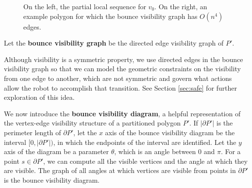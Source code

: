 \documentclass[]{styles/svproc}  %
\begin{document}
\begin{figure}[h]
\begin{subfigure}{0.4\textwidth}
\end{subfigure}
\centering
\caption{On the left, the partial local sequence for $v_0$. On the right, an example polygon for which the bounce visibility graph has
$O(n^4)$ edges.\label{fig:alg1}}
\end{figure}

\begin{definition}
Let the \textbf{bounce visibility graph} be the directed edge visibility graph of
$P'$.
\end{definition}

Although visibility is a symmetric property, we use directed edges in the
bounce visibility graph so that 
we can model the 
geometric constraints on the visibility from one edge to another, which are
not symmetric and govern what actions allow the robot to accomplish that
transition. See Section \ref{sec:safe} for further exploration of this idea.

We now introduce the \textbf{bounce visibility diagram}, a
helpful representation of the vertex-edge visibility structure of a partitioned polygon $P'$.
If $|\partial P'|$ is the perimeter length of $\partial P'$, let the $x$ axis of the
bounce visibility diagram be the interval $[0, |\partial P'|)$, in which the
endpoints of the interval are identified. Let the $y$ axis of the diagram be a
parameter $\theta$, which is an angle between $0$ and $\pi$.
For a point $s \in \partial P'$, we can compute all the visible vertices and
the angle at which they are visible. The graph of all angles at which vertices
are visible from points in $\partial P'$ is the bounce visibility diagram.
\end{document}
